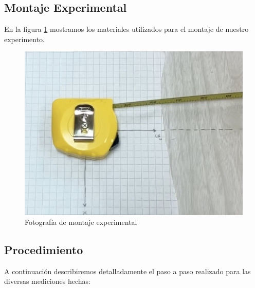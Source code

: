 \documentclass{article}
\begin{document}
\subsection{Montaje Experimental}
  En la figura \ref{fig:montaje} mostramos los materiales utilizados para el montaje de nuestro experimento.
  
\begin{figure}[ht]
    \centering
    \includegraphics[scale=0.25]{Informe/img/montaje1.png}
    \caption{Fotografía de montaje experimental}
    \label{fig:montaje}
\end{figure}
    
\subsection{Procedimiento}
A continuación describiremos detalladamente el paso a paso realizado para las diversas mediciones hechas:
\end{document}
